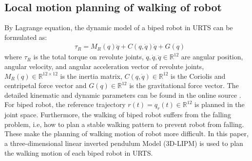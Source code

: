 \documentclass{ieeeaccess}
\begin{document}


\subsection{Local motion planning of walking of robot}
By Lagrange equation, the dynamic model of a biped robot in URTS can be formulated as:
\begin{equation} \label{eq:robot} 
    \begin{split}
        & \tau_R = M_R(q)\ddot{q} + C(q,\dot{q})\dot{q} + G(q)    
    \end{split}
\end{equation}
where $\tau_R$ is the total torque on revolute joints, $q,\dot{q},\ddot{q}\in\mathbb{R}^{12}$  are angular position, angular velocity, and angular acceleration vector of revolute joints, $M_R(q)\in\mathbb{R}^{12\times 12}$ is the inertia matrix, $C(q,\dot{q})\in\mathbb{R}^{12}$ is the Coriolis and centripetal force vector and $G(q)\in\mathbb{R}^{12}$ is the gravitational force vector. The detailed kinematic and dynamic parameters can be found in the online source \cite{ourrobot}. For biped robot, the reference trajectory $r(t)=q_r(t)\in\mathbb{R}^{12}$ is planned in the joint space. Furthermore, the walking of biped robot suffers from the falling problem, i.e, how to plan a stable walking pattern to prevent robot from falling. These make the planning of walking motion of robot more difficult. In this paper, a three-dimensional linear inverted pendulum Model (3D-LIPM) \cite{kajita2001real} is used to plan the walking motion of each biped robot in URTS.
\end{document}
